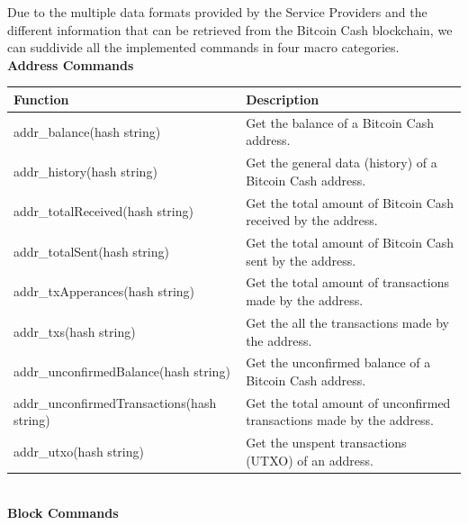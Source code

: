 Due to the multiple data formats provided by the Service Providers and the 
different information that can be retrieved from the Bitcoin Cash blockchain, 
we can suddivide all the implemented commands in four macro categories.\medskip\\
\textbf{Address Commands}
\begin{table}[!ht]
    \centering
    \begin{tabular}{||l|p{6cm}||}
    \hline
    \textbf{Function}                          & \textbf{Description}                                                  \\ \hline
    addr\_balance(hash string)                 & Get the balance of a Bitcoin Cash address.                            \\ \hline
    addr\_history(hash string)                 & Get the general data (history) of a Bitcoin Cash address.             \\ \hline
    addr\_totalReceived(hash string)           & Get the total amount of Bitcoin Cash received by the address.         \\ \hline
    addr\_totalSent(hash string)               & Get the total amount of Bitcoin Cash sent by the address.             \\ \hline
    addr\_txApperances(hash string)            & Get the total amount of transactions made by the address.             \\ \hline
    addr\_txs(hash string)                     & Get the all the transactions made by the address.                     \\ \hline
    addr\_unconfirmedBalance(hash string)      & Get the unconfirmed balance of a Bitcoin Cash address.                \\ \hline
    addr\_unconfirmedTransactions(hash string) & Get the total amount of unconfirmed transactions made by the address. \\ \hline
    addr\_utxo(hash string)                    & Get the unspent transactions (UTXO) of an address.                    \\ \hline
    \end{tabular}
    \end{table}
\medskip\\
\textbf{Block Commands}
